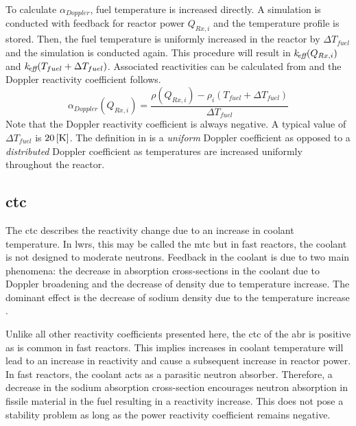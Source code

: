     To calculate $\alpha_{Doppler}$, fuel temperature is increased directly. A
    simulation is conducted with feedback for reactor power $Q_{Rx,i}$ and the
    temperature profile is stored. Then, the fuel temperature is uniformly 
    increased in the reactor by $\Delta T_{fuel}$ and the simulation is
    conducted again. This procedure will result in $k_{\!\mbox{\scriptsize \em eff}}(Q_{Rx,i})$ and
    ${k_{\!\mbox{\scriptsize \em eff}}(T_{fuel} + \Delta T_{fuel})}$. Associated reactivities can be
    calculated from  and the Doppler reactivity coefficient
    follows.
    \begin{equation}
      \label{eq:doppler_reactivity_coefficient}
      \alpha_{Doppler}(Q_{Rx,i}) = \frac{\rho(Q_{Rx,i}) - \rho_i(T_{fuel} +
        \Delta T_{fuel})} {\Delta T_{fuel}}
    \end{equation}
    Note that the Doppler reactivity coefficient is always negative.
    A typical value of $\Delta T_{fuel}$ is $20\left[\text{{K}}\right]$.
    The definition in  is a
    \textit{uniform} Doppler coefficient as opposed to a \textit{distributed} 
    Doppler coefficient as temperatures are increased uniformly throughout the
    reactor.

  \subsection{\gls{ctc}}
  \label{sec:coolant_temperature_reactivity_coefficient}
    The \acrfull{ctc} describes the
    reactivity change due to an increase in coolant temperature. In \glspl{lwr}, 
    this may be called the \gls{mtc} but in fast
    reactors, the coolant is not designed to moderate neutrons. Feedback in the 
    coolant is due to two main phenomena: the decrease in absorption 
    cross-sections in the coolant due to Doppler broadening and the decrease of 
    density due to temperature increase. The dominant effect is the decrease of 
    sodium density due to the temperature increase \cite{textbookknief}.

    Unlike all other reactivity coefficients presented here, the \gls{ctc} of the 
    \gls{abr} is positive as is common in fast reactors. This implies increases 
    in coolant temperature will lead to an increase in reactivity and cause a 
    subsequent increase in reactor power. In fast reactors, the coolant acts as 
    a parasitic neutron absorber. Therefore, a decrease in the sodium absorption 
    cross-section encourages neutron absorption in fissile material in the fuel 
    resulting in a reactivity increase. This does not pose a stability problem 
    as long as the power reactivity coefficient remains negative.


